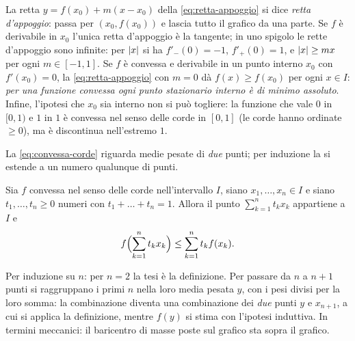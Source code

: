 \begin{osservazione}
\label{oss:convesse-esempi}
La retta $y=f(x_{0})+m(x-x_{0})$ della \eqref{eq:retta-appoggio} si dice \emph{retta
d'appoggio}: passa per $(x_{0},f(x_{0}))$ e lascia tutto il grafico da una parte. Se $f$ è
derivabile in $x_{0}$ l'unica retta d'appoggio è la tangente; in uno spigolo le rette
d'appoggio sono infinite: per $\lvert x\rvert$ si ha $f'_{-}(0)=-1$, $f'_{+}(0)=1$, e
$\lvert x\rvert\ge mx$ per ogni $m\in[-1,1]$. Se $f$ è convessa e derivabile in un punto interno
$x_{0}$ con $f'(x_{0})=0$, la \eqref{eq:retta-appoggio} con $m=0$ dà $f(x)\ge f(x_{0})$
per ogni $x\in I$: \emph{per una funzione convessa ogni punto stazionario interno è di
minimo assoluto}. Infine, l'ipotesi che $x_{0}$ sia interno non si può togliere: la
funzione che vale $0$ in $[0,1)$ e $1$ in $1$ è convessa nel senso delle corde in $[0,1]$
(le corde hanno ordinate $\ge0$), ma è discontinua nell'estremo $1$.
\end{osservazione}

La \eqref{eq:convessa-corde} riguarda medie pesate di \emph{due} punti; per induzione la
si estende a un numero qualunque di punti.

\begin{teorema}\label{teo:jensen}
Sia $f$ convessa nel senso delle corde nell'intervallo $I$, siano $x_{1},\dots,x_{n}\in I$
e siano $t_{1},\dots,t_{n}\ge0$ numeri con $t_{1}+\dots+t_{n}=1$. Allora il punto
$\sum_{k=1}^{n}t_{k}x_{k}$ appartiene a $I$ e
\begin{equation}\label{eq:jensen}
  f\Bigl(\sum_{k=1}^{n}t_{k}x_{k}\Bigr)\le\sum_{k=1}^{n}t_{k}f(x_{k}) .
\end{equation}
\end{teorema}

\begin{schema}
\end{schema}

\begin{strategia}
Per induzione su $n$: per $n=2$ la tesi è la definizione. Per passare da $n$ a $n+1$ punti
si raggruppano i primi $n$ nella loro media pesata $y$, con i pesi divisi per la loro
somma: la combinazione diventa una combinazione dei \emph{due} punti $y$ e $x_{n+1}$, a cui
si applica la definizione, mentre $f(y)$ si stima con l'ipotesi induttiva. In termini
meccanici: il baricentro di masse poste sul grafico sta sopra il grafico.
\end{strategia}

